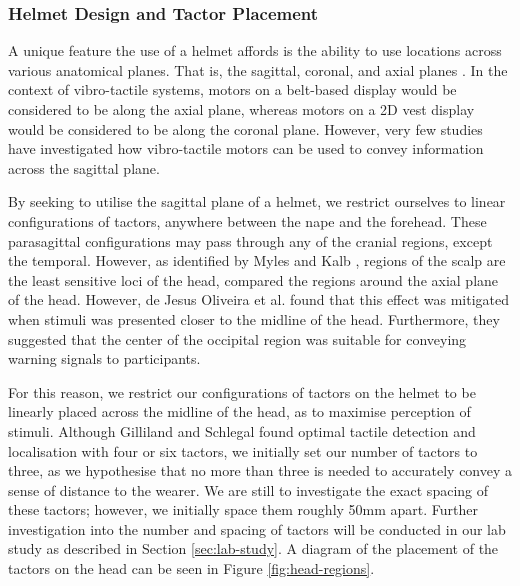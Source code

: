 \documentclass{interim}
\begin{document}
\subsubsection{Helmet Design and Tactor Placement}\label{sec:helmet-design}
A unique feature the use of a helmet affords is the ability to use locations across various anatomical planes. That is, the sagittal, coronal, and axial planes \cite{anatomical}. In the context of vibro-tactile systems, motors on a belt-based display \cite{10.1145/1613858.1613911, 10.1145/2449396.2449450, 10.1145/1060581.1060585} would be considered to be along the axial plane, whereas motors on a 2D vest display \cite{729547, 998954, van2000tactile} would be considered to be along the coronal plane. However, very few studies have investigated how vibro-tactile motors can be used to convey information across the sagittal plane.

By seeking to utilise the sagittal plane of a helmet, we restrict ourselves to linear configurations of tactors, anywhere between the nape and the forehead. These parasagittal configurations may pass through any of the cranial regions, except the temporal. However, as identified by Myles and Kalb \cite{headguidelines}, regions of the scalp are the least sensitive loci of the head, compared the regions around the axial plane of the head. However, de Jesus Oliveira et al. \cite{7463147} found that this effect was mitigated when stimuli was presented closer to the midline of the head. Furthermore, they suggested that the center of the occipital region was suitable for conveying warning signals to participants.

For this reason, we restrict our configurations of tactors on the helmet to be linearly placed across the midline of the head, as to maximise perception of stimuli. Although Gilliland and Schlegal \cite{doi:10.1177/001872089403600410} found optimal tactile detection and localisation with four or six tactors, we initially set our number of tactors to three, as we hypothesise that no more than three is needed to accurately convey a sense of distance to the wearer. We are still to investigate the exact spacing of these tactors; however, we initially space them roughly 50mm apart. Further investigation into the number and spacing of tactors will be conducted in our lab study as described in Section \ref{sec:lab-study}. A diagram of the placement of the tactors on the head can be seen in Figure \ref{fig:head-regions}.
\end{document}
